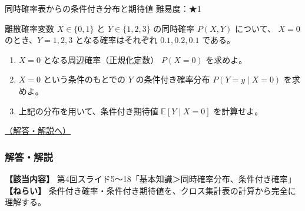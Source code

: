 \begin{questionbox}[label=q:4-1-1]{同時確率表からの条件付き分布と期待値 \hfill \normalfont \small 難易度：★1}

離散確率変数 \(X \in \{0,1\}\) と \(Y \in \{1,2,3\}\) の同時確率
\(P(X, Y)\) について、 \(X=0\) のとき、\(Y=1, 2, 3\)
となる確率はそれぞれ \(0.1, 0.2, 0.1\) である。

\begin{enumerate}
\def\labelenumi{\arabic{enumi}.}
\tightlist
\item
  \(X=0\) となる周辺確率（正規化定数） \(P(X=0)\) を求めよ。
\item
  \(X=0\) という条件のもとでの \(Y\) の条件付き確率分布
  \(P(Y=y \mid X=0)\) を求めよ。
\item
  上記の分布を用いて、条件付き期待値 \(\mathbb{E}[Y \mid X=0]\)
  を計算せよ。
\end{enumerate}

\hfill 

\hyperref[a:4-1-1]{（解答・解説へ）}

\end{questionbox}

\subsubsection{解答・解説}\label{ux89e3ux7b54ux89e3ux8aac-10}

\textbf{【該当内容】}
第4回スライド5〜18「基本知識＞同時確率分布、条件付き確率」
\textbf{【ねらい】}
条件付き確率・条件付き期待値を、クロス集計表の計算から完全に理解する。

